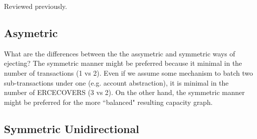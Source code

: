 \documentclass{article}
\begin{document}
Reviewed previously.

\subsection*{Asymetric}

\begin{figure}[H]
    \centering
\end{figure}

What are the differences between the the assymetric and symmetric ways of ejecting? The symmetric manner might be preferred because it minimal in the number of transactions (1 vs 2). Even if we assume some mechanism to batch two sub-transactions under one (e.g. account abstraction), it is minimal in the number of ERCECOVERS (3 vs 2). On the other hand, the symmetric manner might be preferred for the more ``balanced" resulting capacity graph.

\subsection*{Symmetric Unidirectional}

\begin{figure}[H]
    \centering
\end{figure}
\end{document}

